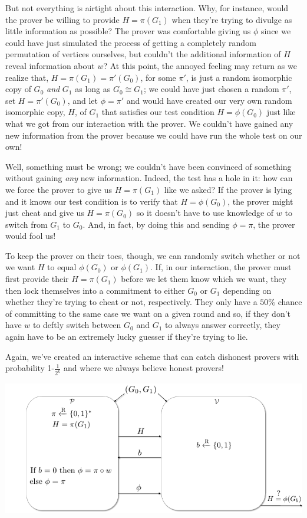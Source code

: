		But not everything is airtight about this interaction.  Why, for instance, would the prover be willing to provide $H=\pi(G_1)$ when they're trying to divulge as little information as possible?  The prover was comfortable giving us $\phi$ since we could have just simulated the process of getting a completely random permutation of vertices ourselves, but couldn't the additional information of $H$ reveal information about $w$?  At this point, the annoyed feeling may return as we realize that, $H=\pi(G_1)=\pi'(G_0)$, for some $\pi'$, is just a random isomorphic copy of $G_0$ \textit{and} $G_1$ as long as $G_0 \cong G_1$; we could have just chosen a random $\pi'$, set $H=\pi'(G_0)$, and let $\phi=\pi'$ and would have created our very own random isomorphic copy, $H$, of $G_1$ that satisfies our test condition $H=\phi(G_0)$ just like what we got from our interaction with the prover.  We couldn't have gained any new information from the prover because we could have run the whole test on our own!
		
		Well, something must be wrong; we couldn't have been convinced of something without gaining \textit{any} new information.  Indeed, the test has a hole in it: how can we force the prover to give us $H=\pi(G_1)$ like we asked?  If the prover is lying and it knows our test condition is to verify that $H=\phi(G_0)$, the prover might just cheat and give us $H=\pi(G_0)$ so it doesn't have to use knowledge of $w$ to switch from $G_1$ to $G_0$.  And, in fact, by doing this and sending $\phi=\pi$, the prover would fool us!
		
		To keep the prover on their toes, though, we can randomly switch whether or not we want $H$ to equal $\phi(G_0)$ or $\phi(G_1)$.  If, in our interaction, the prover must first provide their $H=\pi(G_1)$ before we let them know which we want, they then lock themselves into a commitment to either $G_0$ or $G_1$ depending on whether they're trying to cheat or not, respectively.  They only have a $50\%$ chance of committing to the same case we want on a given round and so, if they don't have $w$ to deftly switch between $G_0$ and $G_1$ to always answer correctly, they again have to be an extremely lucky guesser if they're trying to lie.
		
		Again, we've created an interactive scheme that can catch dishonest provers with probability 1-$\frac{1}{2^k}$ and where we always believe honest provers!
		
		\begin{center}
			\includegraphics[scale=.51094]{Old Scribe Notes/GI_ZK_Protocol.png}
		\end{center}
		
